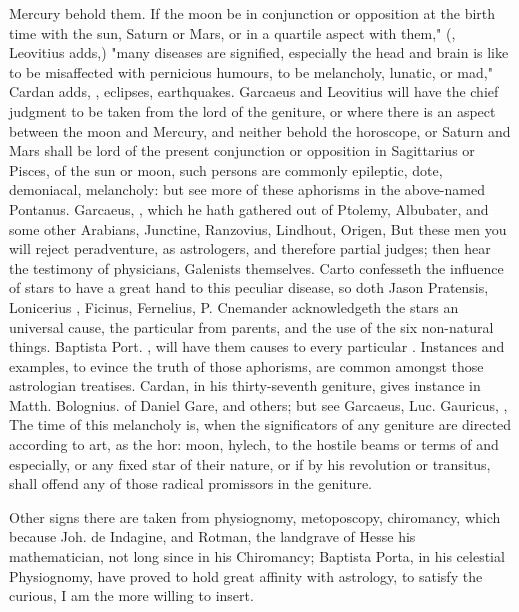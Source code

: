 Mercury behold them. If the moon be in conjunction or
opposition at the birth time with the sun, Saturn or Mars, or in a quartile
aspect with them," (, Leovitius adds,) "many diseases are
signified, especially the head and brain is like to be misaffected with
pernicious humours, to be melancholy, lunatic, or mad," Cardan adds, , eclipses, earthquakes. Garcaeus and Leovitius will have the chief
judgment to be taken from the lord of the geniture, or where there is an aspect
between the moon and Mercury, and neither behold the horoscope, or Saturn and
Mars shall be lord of the present conjunction or opposition in Sagittarius or
Pisces, of the sun or moon, such persons are commonly epileptic, dote,
demoniacal, melancholy: but see more of these aphorisms in the above-named
Pontanus. Garcaeus, , which he hath gathered out of Ptolemy,
Albubater, and some other Arabians, Junctine, Ranzovius, Lindhout, Origen,
\etc{} But these men you will reject peradventure, as astrologers, and
therefore partial judges; then hear the testimony of physicians, Galenists
themselves. Carto confesseth the influence of stars to
have a great hand to this peculiar disease, so doth Jason Pratensis, Lonicerius
, Ficinus, Fernelius, \etc{}
P. Cnemander acknowledgeth the stars an universal cause,
the particular from parents, and the use of the six non-natural things.
Baptista Port. , will have them
causes to every particular . Instances and examples, to evince
the truth of those aphorisms, are common amongst those astrologian treatises.
Cardan, in his thirty-seventh geniture, gives instance in Matth. Bolognius.
 of
Daniel Gare, and others; but see Garcaeus,  Luc.
Gauricus, , \etc{} The time of this
melancholy is, when the significators of any geniture are directed according to
art, as the hor: moon, hylech, \etc{} to the hostile beams or terms of \saturn{} and \mars{}
especially, or any fixed star of their nature, or if \saturn{} by his revolution or
transitus, shall offend any of those radical promissors in the geniture.

Other signs there are taken from physiognomy, metoposcopy, chiromancy, which
because Joh. de Indagine, and Rotman, the landgrave of Hesse his mathematician,
not long since in his Chiromancy; Baptista Porta, in his celestial Physiognomy,
have proved to hold great affinity with astrology, to satisfy the curious, I am
the more willing to insert.

